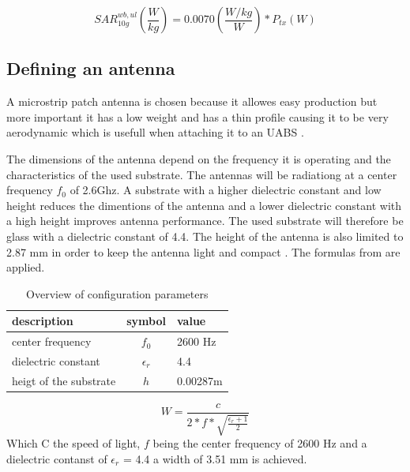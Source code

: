 \begin{equation} 
SAR^{wb,ul}_{10g} \left(\frac{W}{kg}\right) = 0.0070 \left(\frac{W/kg}{W}\right) * P_{tx} (W)
\label{eq:solve}
\end{equation}



\subsection{Defining an antenna}
\label{sub:definingAntenna}
A microstrip patch antenna is chosen because it allowes easy production but more important it has a low weight and has a thin profile causing it to be very aerodynamic which is usefull when attaching it to an \gls{UABS} \cite{J13_microstripadvantages}.

The dimensions of the antenna depend on the frequency it is operating and the characteristics of the used substrate.
The antennas will be radiationg at a center frequency $f_0$ of 2.6Ghz. A substrate with a higher dielectric constant and low height reduces the dimentions of the antenna
and a lower dielectric constant with a high height improves antenna performance. The used substrate will therefore be glass with a dielectric constant of 4.4. The height of the antenna is also limited to 2.87 mm in order to keep the antenna light and compact \cite{J14_antennadesign}.
The formulas from \cite{J14_antennadesign} are \cite{J15_antennadesign} applied. 

\begin{table}[h!]
\centering
\begin{tabular}{|l|c|l|}
\hline
 description                & symbol          & value         \\    \hline
 center frequency       & $f_0$           & 2600 Hz       \\ 
 dielectric constant    & $\epsilon_r$    & 4.4         \\ 
 heigt of the substrate & $h$             & 0.00287m    \\ \hline
\end{tabular}
\caption{Overview of configuration parameters}
\end{table}

\begin{equation} 
W = \frac{c}{2*f*\sqrt{\frac{\epsilon_r+1}{2}}}
\end{equation}
Which C the speed of light, $f$ being the center frequency of 2600 Hz and a dielectric contanst of $\epsilon_r$ = 4.4 a width of 3.51 mm is achieved.


